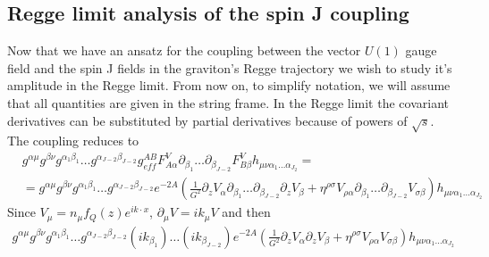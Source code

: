 \documentclass[10 pt]{article}
\begin{document}
\subsection{Regge limit analysis of the spin J coupling}
Now that we have an ansatz for the coupling between the vector $U(1)$ gauge field and the spin J fields in the graviton's Regge trajectory we wish to study it's amplitude in the Regge limit. From now on, to simplify notation, we will assume that all quantities are given in the string frame. In the Regge limit the covariant derivatives can be substituted by partial derivatives because of powers of $\sqrt{s}$. The coupling reduces to
\begin{align}
&g^{\alpha \mu} g^{\beta \nu} g^{\alpha_1 \beta_1} \dots g^{\alpha_{J-2} \beta_{J-2}} g^{AB}_{eff} F^{V}_{A \alpha} \partial_{\beta_1} \dots \partial_{\beta_{J-2}} F^{V}_{B \beta} h_{\mu \nu \alpha_1 \dots \alpha_{J_2}} = \\
& = g^{\alpha \mu} g^{\beta \nu} g^{\alpha_1 \beta_1} \dots g^{\alpha_{J-2} \beta_{J-2}} e^{-2A} \left( \frac{1}{G^2} \partial_z V_\alpha \partial_{\beta_1} \dots \partial_{\beta_{J-2}} \partial_z V_\beta + \eta^{\rho \sigma} V_{\rho \alpha} \partial_{\beta_1} \dots \partial_{\beta_{J-2}} V_{\sigma \beta} \right) h_{\mu \nu \alpha_1 \dots \alpha_{J_2}}
\end{align}
Since $V_\mu = n_\mu f_Q \left( z\right) e^{i k \cdot x}$, $\partial_\mu V = i k_\mu V$ and then
\begin{align}
g^{\alpha \mu} g^{\beta \nu} g^{\alpha_1 \beta_1} \dots g^{\alpha_{J-2} \beta_{J-2}} \left( i k_{\beta_1}\right) \dots  \left( i k_{\beta_{J-2}}\right) e^{-2A} \left( \frac{1}{G^2} \partial_z V_\alpha  \partial_z V_\beta + \eta^{\rho \sigma} V_{\rho \alpha} V_{\sigma \beta} \right) h_{\mu \nu \alpha_1 \dots \alpha_{J_2}}
\end{align}
\end{document}
